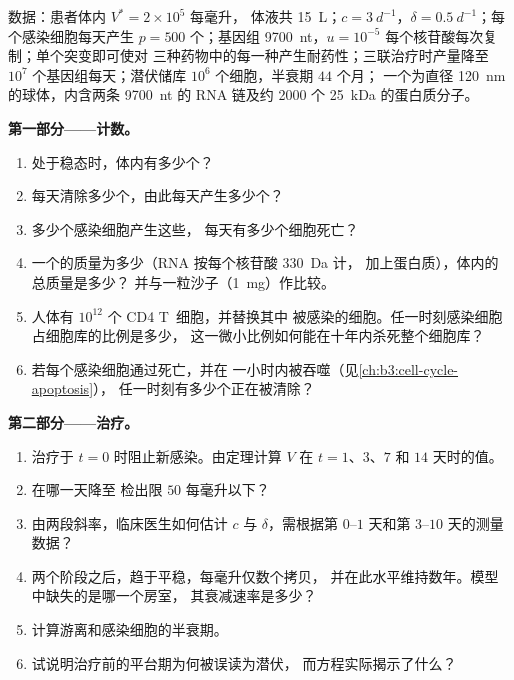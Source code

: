 \begin{problem}
\label{pb:b3:virology:1}
数据：患者体内 $V^{*} = 2\times 10^{5}$ 每毫升，
体液共 \qty{15}{L}；$c = \qty{3}{d^{-1}}$，$\delta = \qty{0.5}{d^{-1}}$；每个感染细胞每天产生
$p = 500$ 个；基因组 \qty{9700}{nt}，$u = 10^{-5}$
每个核苷酸每次复制；单个突变即可使对
三种药物中的每一种产生耐药性；三联治疗时产量降至
$10^{7}$ 个基因组每天；潜伏储库 $10^{6}$ 个细胞，半衰期 $44$ 个月；
一个为直径 \qty{120}{nm} 的球体，内含两条 \qty{9700}{nt} 的 RNA
链及约 \num{2000} 个 \qty{25}{kDa} 的蛋白质分子。

\medskip
\noindent\textbf{第一部分——计数。}
\begin{enumerate}
  \item 处于稳态时，体内有多少个？
  \item 每天清除多少个，由此每天产生多少个？
  \item 多少个感染细胞产生这些，
        每天有多少个细胞死亡？
  \item 一个的质量为多少（RNA 按每个核苷酸 \qty{330}{Da} 计，
        加上蛋白质），体内的总质量是多少？
        并与一粒沙子（\qty{1}{mg}）作比较。
  \item 人体有 $10^{12}$ 个 CD4 T~细胞，并替换其中
        被感染的细胞。任一时刻感染细胞占细胞库的比例是多少，
        这一微小比例如何能在十年内杀死整个细胞库？
  \item 若每个感染细胞通过死亡，并在
        一小时内被吞噬（见\cref{ch:b3:cell-cycle-apoptosis}），
        任一时刻有多少个正在被清除？
\end{enumerate}

\medskip
\noindent\textbf{第二部分——治疗。}
\begin{enumerate}[resume]
  \item 治疗于 $t = 0$ 时阻止新感染。由定理计算 $V$ 在 $t =
        1$、$3$、$7$ 和 $14$ 天时的值。
  \item {}在哪一天降至
        检出限 $50$ 每毫升以下？
  \item 由两段斜率，临床医生如何估计 $c$ 与
        $\delta$，需根据第 $0$--$1$ 天和第 $3$--$10$ 天的测量数据？
  \item 两个阶段之后，趋于平稳，每毫升仅数个拷贝，
        并在此水平维持数年。模型中缺失的是哪一个房室，
        其衰减速率是多少？
  \item 计算游离和感染细胞的半衰期。
  \item 试说明治疗前的平台期为何被误读为潜伏，
        而方程实际揭示了什么？
\end{enumerate}


\end{problem}
